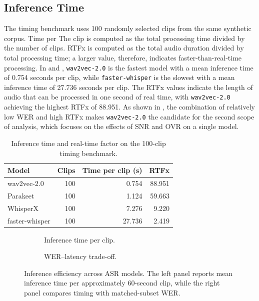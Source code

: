 \subsection{Inference Time}
The timing benchmark uses 100 randomly selected clips from the same synthetic corpus. Time per
The clip is computed as the total processing time divided by the number of clips. RTFx is computed as
the total audio duration divided by total processing time; a larger value, therefore, indicates
faster-than-real-time processing. In  and , \texttt{wav2vec-2.0} is the fastest model with a mean inference time of 0.754 seconds per clip, while \texttt{faster-whisper} is the slowest with a mean inference time of 27.736 seconds per clip. The RTFx values indicate the length of audio that can be processed in one second of real time, with \texttt{wav2vec-2.0} achieving the highest RTFx of 88.951. As shown in , the combination of relatively low WER and high RTFx makes \texttt{wav2vec-2.0} the candidate for the second scope of analysis, which focuses on the effects of SNR and OVR on a single model.

\begin{table}[htbp]
\centering
\caption{Inference time and real-time factor on the 100-clip timing benchmark.}
\label{tab:timing_efficiency}
\begin{tabular}{lrrr}
\toprule
\textbf{Model} & \textbf{Clips} & \textbf{Time per clip (s)} & \textbf{RTFx} \\
\midrule
wav2vec-2.0 & 100 & 0.754 & 88.951 \\
Parakeet & 100 & 1.124 & 59.663 \\
WhisperX & 100 & 7.276 & 9.220 \\
faster-whisper & 100 & 27.736 & 2.419 \\
\bottomrule
\end{tabular}
\end{table}

\begin{figure}[htbp]
    \centering
    \begin{subfigure}[t]{0.49\linewidth}
        \centering
        \caption{Inference time per clip.}
        \label{fig:stat_time_per_clip_bar}
    \end{subfigure}
    \hfill
    \begin{subfigure}[t]{0.49\linewidth}
        \centering
        \caption{WER--latency trade-off.}
        \label{fig:stat_accuracy_latency_tradeoff_panel}
    \end{subfigure}
    \caption{Inference efficiency across ASR models. The left panel reports mean inference time per approximately 60-second clip, while the right panel compares timing with matched-subset WER.}
\end{figure}


